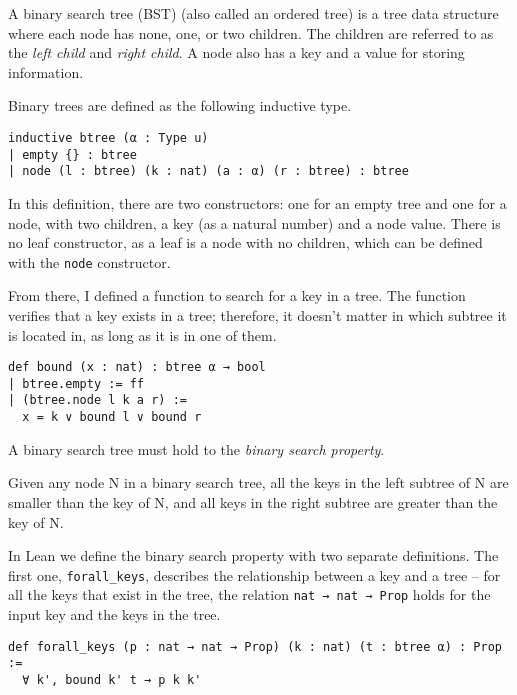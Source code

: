 A binary search tree (BST) (also called an ordered tree) is a tree data structure where each node has none, one, or two children. The children are referred to as the \textit{left child} and \textit{right child}. A node also has a key and a value for storing information.

Binary trees are defined as the following inductive type.

\begin{lstlisting}
inductive btree (α : Type u)
| empty {} : btree
| node (l : btree) (k : nat) (a : α) (r : btree) : btree
\end{lstlisting}

In this definition, there are two constructors: one for an empty tree and one for a node, with two children, a key (as a natural number) and a node value. There is no leaf constructor, as a leaf is a node with no children, which can be defined with the \lstinline{node} constructor.

From there, I defined a function to search for a key in a tree. The function verifies that a key exists in a tree; therefore, it doesn't matter in which subtree it is located in, as long as it is in one of them.

\begin{lstlisting}
def bound (x : nat) : btree α → bool
| btree.empty := ff
| (btree.node l k a r) :=
  x = k ∨ bound l ∨ bound r
\end{lstlisting}

A binary search tree must hold to the \textit{binary search property}.

\begin{definition}
  \label{def:bst_property}
  Given any node N in a binary search tree, all the keys in the left subtree of N are smaller than the key of N, and all keys in the right subtree are greater than the 
  key of N.
\end{definition}

In Lean we define the binary search property with two separate definitions. The first one, \lstinline{forall_keys}, describes the relationship between a key and a tree -- for all the keys that exist in the tree, the relation \lstinline{nat → nat → Prop} holds for the input key and the keys in the tree.

\begin{lstlisting}
def forall_keys (p : nat → nat → Prop) (k : nat) (t : btree α) : Prop :=
  ∀ k', bound k' t → p k k'
\end{lstlisting}

